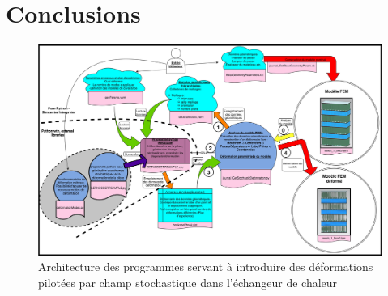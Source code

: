 \documentclass[a4paper,10pt]{article}
\begin{document}
\section{Conclusions}




\appendix 
\appendixpage
\addappheadtotoc

\begin{figure}[H]
   \centering
   \vspace{-2cm}
   \includegraphics[angle=-90,origin=c,width=1.1\textwidth,height=1.1\textheight,keepaspectratio]{SchemaDeformationNastran.jpg}
      \caption{Architecture des programmes servant à introduire des déformations pilotées par champ stochastique dans l'échangeur de chaleur}
         \label{SchemaDeformationNastran}
\end{figure}
\end{document}
